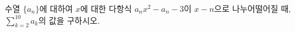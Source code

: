 수열 $\{a_n\}$에 대하여 $x$에 대한 다항식 $a_nx^2-a_n-3$이 $x-n$으로 나누어떨어질 때, $\displaystyle\sum_{k=2}^{10}a_k$의 값을 구하시오.

